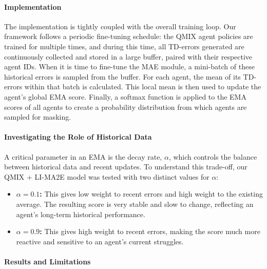 \paragraph{Implementation}
The implementation is tightly coupled with the overall training loop. Our framework follows a periodic fine-tuning schedule: the QMIX agent policies are trained for multiple times, and during this time, all TD-errors generated are continuously collected and stored in a large buffer, paired with their respective agent IDs. When it is time to fine-tune the MAE module, a mini-batch of these historical errors is sampled from the buffer. For each agent, the mean of its TD-errors within that batch is calculated. This local mean is then used to update the agent's global EMA score. Finally, a softmax function is applied to the EMA scores of all agents to create a probability distribution from which agents are sampled for masking.

\paragraph{Investigating the Role of Historical Data}
A critical parameter in an \ac{EMA} is the decay rate, $\alpha$, which controls the balance between historical data and recent updates. To understand this trade-off, our QMIX + LI-MA2E model was tested with two distinct values for $\alpha$:
\begin{itemize}
\item \textbf{$\alpha=0.1$:} This gives low weight to recent errors and high weight to the existing average. The resulting score is very stable and slow to change, reflecting an agent's long-term historical performance.
\item \textbf{$\alpha=0.9$:} This gives high weight to recent errors, making the score much more reactive and sensitive to an agent's current struggles.
\end{itemize}

\paragraph{Results and Limitations}

